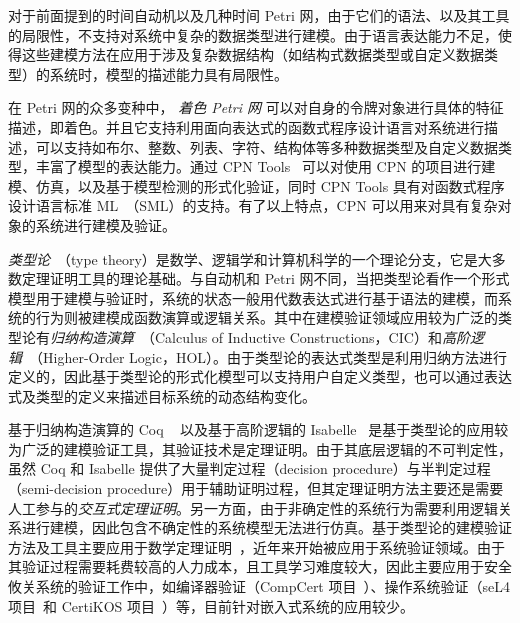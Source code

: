 对于前面提到的时间自动机以及几种时间 Petri 网，由于它们的语法、以及其工具的局限性，不支持对系统中复杂的数据类型进行建模。由于语言表达能力不足，使得这些建模方法在应用于涉及复杂数据结构（如结构式数据类型或自定义数据类型）的系统时，模型的描述能力具有局限性。

在 Petri 网的众多变种中，
\emph{着色 Petri 网} 可以对自身的令牌对象进行具体的特征描述，即着色。并且它支持利用面向表达式的函数式程序设计语言对系统进行描述，可以支持如布尔、整数、列表、字符、结构体等多种数据类型及自定义数据类型，丰富了模型的表达能力。通过 CPN Tools~\cite{DBLP:journals/sttt/JensenKW07} 可以对使用 CPN 的项目进行建模、仿真，以及基于模型检测的形式化验证，同时 CPN Tools 具有对函数式程序设计语言标准 ML~\cite{DBLP:conf/tphol/Syme93}（SML）的支持。有了以上特点，CPN 可以用来对具有复杂对象的系统进行建模及验证。

\emph{类型论}~\cite{DBLP:books/daglib/0070479}（type theory）是数学、逻辑学和计算机科学的一个理论分支，它是大多数定理证明工具的理论基础。与自动机和 Petri 网不同，当把类型论看作一个形式模型用于建模与验证时，系统的状态一般用代数表达式进行基于语法的建模，而系统的行为则被建模成函数演算或逻辑关系。其中在建模验证领域应用较为广泛的类型论有\emph{归纳构造演算}~\cite{DBLP:conf/mpc/Parent95}（Calculus of Inductive Constructions，CIC）和\emph{高阶逻辑}~\cite{van1983higher}（Higher-Order Logic，HOL）。由于类型论的表达式类型是利用归纳方法进行定义的，因此基于类型论的形式化模型可以支持用户自定义类型，也可以通过表达式及类型的定义来描述目标系统的动态结构变化。

基于归纳构造演算的 Coq ~\cite{DBLP:series/txtcs/BertotC04} 以及基于高阶逻辑的 Isabelle~\cite{DBLP:books/sp/NipkowPW02} 是基于类型论的应用较为广泛的建模验证工具，其验证技术是定理证明。由于其底层逻辑的不可判定性，虽然 Coq 和 Isabelle 提供了大量判定过程（decision procedure）与半判定过程（semi-decision procedure）用于辅助证明过程，但其定理证明方法主要还是需要人工参与的\emph{交互式定理证明}。另一方面，由于非确定性的系统行为需要利用逻辑关系进行建模，因此包含不确定性的系统模型无法进行仿真。基于类型论的建模验证方法及工具主要应用于数学定理证明~\cite{DBLP:conf/ascm/Gonthier07,DBLP:journals/jar/Paulson15}，近年来开始被应用于系统验证领域。由于其验证过程需要耗费较高的人力成本，且工具学习难度较大，因此主要应用于安全攸关系统的验证工作中，如编译器验证（CompCert 项目~\cite{DBLP:journals/cacm/Leroy09,DBLP:conf/popl/StewartBCA15}）、操作系统验证（seL4 项目~\cite{DBLP:conf/sosp/KleinEHACDEEKNSTW09}和 CertiKOS 项目~\cite{DBLP:conf/apsys/GuVFSC11,DBLP:conf/osdi/GuSCWKSC16}）等，目前针对嵌入式系统的应用较少。

